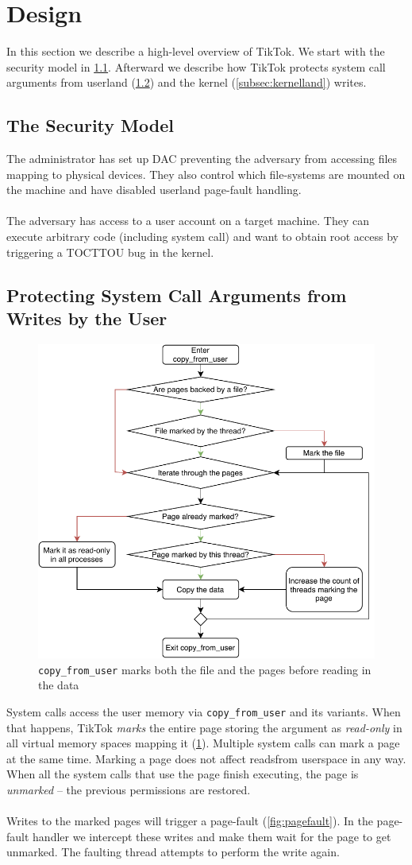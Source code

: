 \section{Design}
\label{sec:design}
In this section we describe a high-level overview of TikTok. We start with the 
security model in \cref{subsec:secmodel}. Afterward we describe how TikTok 
protects system call arguments from userland (\cref{subsec:userland}) and the 
kernel (\cref{subsec:kernelland}) writes.

\subsection{The Security Model}
\label{subsec:secmodel}
The administrator has set up DAC preventing the adversary from accessing files 
mapping to physical devices. They also control which file-systems are mounted on
the machine and have disabled userland page-fault handling.
\\
\\
The adversary has access to a user account on a target machine. They can execute
arbitrary code (including system call) and want to obtain root access by 
triggering a TOCTTOU bug in the kernel.

\subsection{Protecting System Call Arguments from Writes by the User}
\label{subsec:userland}
\begin{figure}[]
  \centering
  \includegraphics[width = .45 \textwidth]{img/copy_from_user.pdf}
  \caption{\texttt{copy\_from\_user} marks both the file and the pages before
  reading in the data}
  \label{fig:copyfromuser}
\end{figure}

System calls access the user memory via \texttt{copy\_from\_user} and its 
variants. When that happens, TikTok \emph{marks} the entire page storing the 
argument as \emph{read-only} in all virtual memory spaces mapping it 
(\cref{fig:copyfromuser}). Multiple system calls can mark a page at the same 
time. Marking a page does not affect readsfrom userspace in any way. When all 
the system calls that use the page finish executing, the page is \emph{unmarked}
 -- the previous permissions are restored.
\\
\\
Writes to the marked pages will trigger a page-fault (\cref{fig:pagefault}). In 
the page-fault handler we intercept these writes and make them wait for the page
to get unmarked. The faulting thread attempts to perform the write again.


